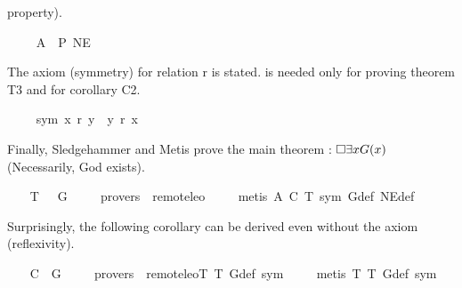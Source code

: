 \begin{isabellebody}
\begin{isamarkuptext}
property).%
\end{isamarkuptext}%
\isamarkuptrue%
\ \ \isamarkupfalse%
\ \ A{}{\isacharcolon}\ \ {\isachardoublequoteopen}{\isacharbrackleft}P\ NE{\isacharbrackright}{\isachardoublequoteclose}%
\begin{isamarkuptext}%
The  axiom (symmetry) for relation r is stated.  is needed only 
for proving theorem T3 and for corollary C2.%
\end{isamarkuptext}%
\isamarkuptrue%
\ \ \isamarkupfalse%
\ \ sym{\isacharcolon}\ {\isachardoublequoteopen}x\ r\ y\ {\isasymlongrightarrow}\ y\ r\ x{\isachardoublequoteclose}%
\begin{isamarkuptext}%
Finally, Sledgehammer and Metis prove the main theorem : $\Box \exists x G(x)$ \\
(Necessarily, God exists).%
\end{isamarkuptext}%
\isamarkuptrue%
\ \ \isamarkupfalse%
\ T{}{\isacharcolon}\ {\isachardoublequoteopen}{\isacharbrackleft}{\isasymbox}\ {\isacharparenleft}{\isasymexists}\ G{\isacharparenright}{\isacharbrackright}{\isachardoublequoteclose}\ \isanewline
\ \ \isamarkupfalse%
\ {\isacharbrackleft}provers\ {\isacharequal}\ remote{\isacharunderscore}leo{}{\isacharbrackright}\ \isanewline
%
\isadelimproof
\ \ %
\endisadelimproof
%
\isatagproof
{}\isamarkupfalse%
\ {\isacharparenleft}metis\ A{}\ C\ T{}\ sym\ G{\isacharunderscore}def\ NE{\isacharunderscore}def{\isacharparenright}%
\endisatagproof
{\isafoldproof}%
%
\isadelimproof
%
\endisadelimproof
%
\begin{isamarkuptext}%
Surprisingly, the following corollary can be derived even without the  axiom 
(reflexivity).%
\end{isamarkuptext}%
\isamarkuptrue%
\ \ \isamarkupfalse%
\ C{}{\isacharcolon}\ {\isachardoublequoteopen}{\isacharbrackleft}{\isasymexists}\ G{\isacharbrackright}{\isachardoublequoteclose}\ \isanewline
\ \ \isamarkupfalse%
\ {\isacharbrackleft}provers\ {\isacharequal}\ remote{\isacharunderscore}leo{}{\isacharbrackright}{\isacharparenleft}T{}\ T{}\ G{\isacharunderscore}def\ sym{\isacharparenright}\ \isanewline
%
\isadelimproof
\ \ %
\endisadelimproof
%
\isatagproof
{}\isamarkupfalse%
\ {\isacharparenleft}metis\ T{}\ T{}\ G{\isacharunderscore}def\ sym{\isacharparenright}%

\end{isabellebody}
